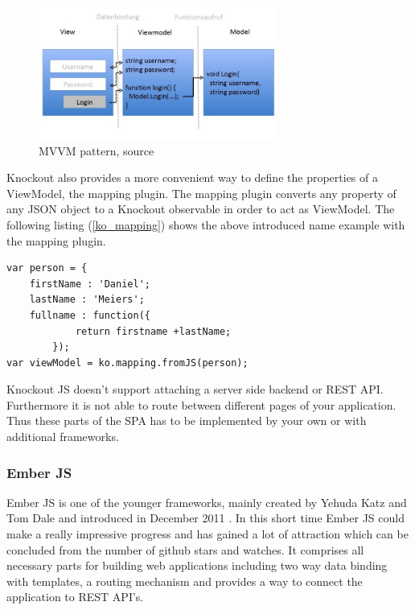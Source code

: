 \begin{figure}[h]
	\centering	
	\includegraphics[width=0.7\textwidth]{./img/tech-ana/mvvm.jpeg}
	\caption{MVVM pattern, source \autocite{heise_knockout}}
	\label{fig:mvvm}
\end{figure}

Knockout also provides a more convenient way to define the properties of a ViewModel, the mapping plugin.
The mapping plugin converts any property of any JSON object to a Knockout observable in order to act as ViewModel.
The following listing (\ref{ko_mapping}) shows the above introduced name example with the mapping plugin.

\begin{lstlisting}[label=ko_mapping,caption=the mapping plugin]
var person = {
	firstName : 'Daniel';
	lastName : 'Meiers';
	fullname : function({
			return firstname +lastName;
		});
var viewModel = ko.mapping.fromJS(person);
\end{lstlisting}

Knockout JS doesn't support attaching a server side backend or REST API.
Furthermore it is not able to route between different pages of your application.
Thus these parts of the SPA has to be implemented by your own or with additional frameworks.

\subsubsection{Ember JS}

Ember JS is one of the younger frameworks, mainly created by Yehuda Katz and Tom Dale and introduced in December 2011 \autocite{tech-ana:announcing-ember}.
In this short time Ember JS could make a really impressive progress and has gained a lot of attraction which can be concluded from the number of github stars and watches.
It comprises all necessary parts for building web applications including two way data binding with templates, a routing mechanism and provides a way to connect the application to REST API's.

